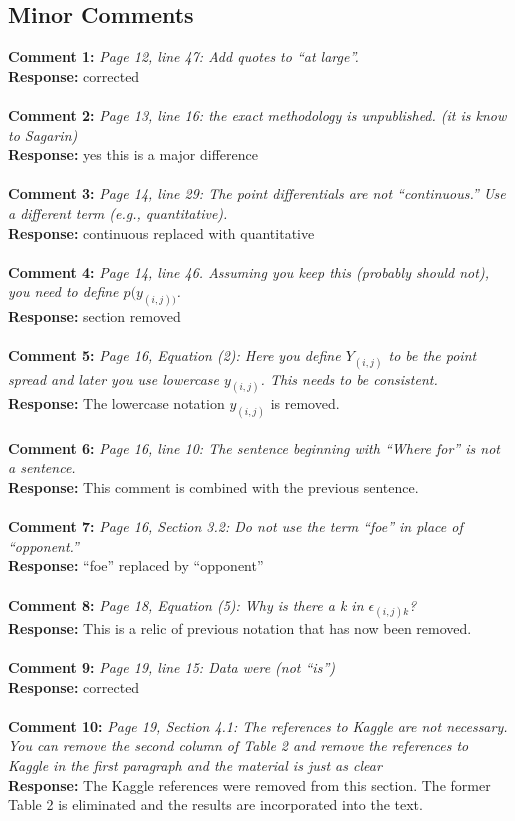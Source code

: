 \documentclass[11pt]{article} %
\begin{document}
\subsection*{Minor Comments}
{\bf Comment 1:} \emph{Page 12, line 47: Add quotes to ``at large''.}\\
{\bf Response:} corrected\\
\\
{\bf Comment 2:} \emph{Page 13, line 16: the exact methodology is unpublished. (it is know to Sagarin)}\\
{\bf Response:} yes this is a major difference\\
\\
{\bf Comment 3:} \emph{Page 14, line 29: The point differentials are not ``continuous.'' Use a different term (e.g., quantitative).}\\
{\bf Response:} continuous replaced with quantitative\\
\\
{\bf Comment 4:} \emph{Page 14, line 46. Assuming you keep this (probably should not), you need to define $p(y_{(i,j))}$.}\\
{\bf Response:} section removed\\
\\
{\bf Comment 5:} \emph{Page 16, Equation (2): Here you define $Y_{(i,j)}$ to be the point spread and later you use lowercase $y_{(i,j)}$. This needs to be consistent.}\\
{\bf Response:} The lowercase notation $y_{(i,j)}$ is removed. \\
\\
{\bf Comment 6:} \emph{Page 16, line 10: The sentence beginning with ``Where for'' is not a sentence.}\\
{\bf Response:} This comment is combined with the previous sentence.\\
\\
{\bf Comment 7:} \emph{Page 16, Section 3.2: Do not use the term ``foe'' in place of ``opponent.''}\\
{\bf Response:} ``foe'' replaced by ``opponent''\\
\\
{\bf Comment 8:} \emph{Page 18, Equation (5): Why is there a k in $\epsilon_{(i,j)k}$?}\\
{\bf Response:} This is a relic of previous notation that has now been removed.\\
\\
{\bf Comment 9:} \emph{Page 19, line 15: Data were (not ``is'')}\\
{\bf Response:} corrected\\
\\
{\bf Comment 10:} \emph{Page 19, Section 4.1: The references to Kaggle are not necessary. You can remove the second column of Table 2 and remove the references to Kaggle in the first paragraph and the material is just as clear}\\
{\bf Response:} The Kaggle references were removed from this section. The former Table 2 is eliminated and the results are incorporated into the text.\\
\\
\end{document}
